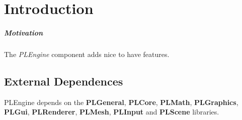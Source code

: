 \chapter{Introduction}


\paragraph{Motivation}
The \emph{PLEngine} component adds nice to have features.




\section{External Dependences}
PLEngine depends on the \textbf{PLGeneral}, \textbf{PLCore}, \textbf{PLMath}, \textbf{PLGraphics}, \textbf{PLGui}, \textbf{PLRenderer}, \textbf{PLMesh}, \textbf{PLInput} and \textbf{PLScene} libraries.
